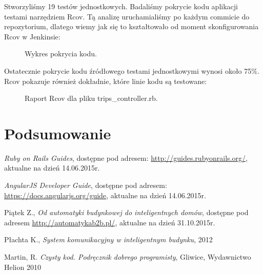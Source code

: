 \documentclass[eng,oneside]{mgr}
\begin{document}
Stworzyliśmy 19 testów jednostkowych. Badaliśmy pokrycie kodu aplikacji testami narzędziem Rcov. Tą analizę uruchamialiśmy po każdym commicie do repozytorium, dlatego wiemy jak się to kształtowało od moment skonfigurowania Rcov w Jenkinsie:
\begin{figure}[h]
	\centering
	\caption{Wykres pokrycia kodu.}
	\label{fig:testy}
\end{figure}

Ostatecznie pokrycie kodu źródłowego testami jednostkowymi wynosi około 75\%. Rcov pokazuje również dokładnie, które linie kodu są testowane:
\begin{figure}[h]
	\centering
	\caption{Raport Rcov dla pliku trips\_controller.rb.}
	\label{fig:raport}
\end{figure}
\chapter{Podsumowanie}

\begin{thebibliography}{inteligencja}
	
	\emph{Ruby on Rails Guides}, dostępne pod adresem: \url{http://guides.rubyonrails.org/},\\ aktualne na dzień 14.06.2015r.
	
	\emph{AngularJS Developer Guide}, dostępne pod adresem: \url{https://docs.angularjs.org/guide}, aktualne na dzień 14.06.2015r.

	Piątek Z., \emph{Od automatyki budynkowej do inteligentnych domów}, dostępne pod adresem \url{http://automatykab2b.pl/}, aktualne na dzień 31.10.2015r.

	Płachta K., \emph{System komunikacyjny w inteligentnym budynku}, 2012

	Martin, R. \emph{Czysty kod. Podręcznik dobrego programisty}, Gliwice, Wydawnictwo Helion 2010
	
\end{thebibliography}
\end{document}
